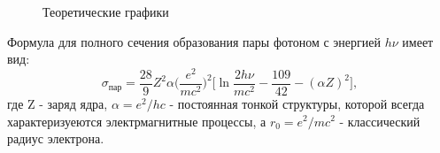 \documentclass[a4paper,12pt]{article}
\theoremstyle{plain} %
\theoremstyle{definition} %
\theoremstyle{remark} %
\begin{document}
\begin{figure}[htp] 
    \centering
    \hfill%

        
     \caption{Теоретические графики}   
\end{figure}



\newpage

Формула для полного сечения образования пары фотоном с энергией $h \nu$ имеет вид:
\[\sigma_\text{пар} = \dfrac{28}{9} Z^2 \alpha \big(\dfrac{e^2}{mc^2} \big)^2 \big[\ln{\dfrac{2 h \nu}{mc^2}} - \dfrac{109}{42} - (\alpha Z)^2 \big],  \] где Z - заряд ядра, $\alpha = e^2 / h c$ - постоянная тонкой структуры, которой всегда характеризуеются электрмагнитные процессы, а $r_0 = e^2/mc^2$ - классический радиус электрона.
\end{document}
